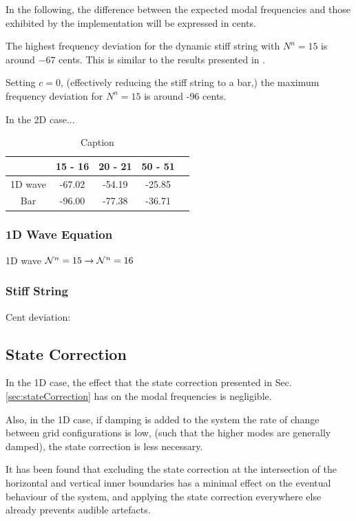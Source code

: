 \documentclass[fleqn]{jaes}
\begin{document}
In the following, the difference between the expected modal frequencies and those exhibited by the implementation will be expressed in cents.

The highest frequency deviation for the dynamic stiff string with $N^n = 15$ is around $-67$ cents. This is similar to the results presented in \cite{Willemsen2021a}.

Setting $c=0$, (effectively reducing the stiff string to a bar,) the maximum frequency deviation for $N^n=15$ is around -96 cents. 

In the 2D case...

\begin{table}[h]
    \centering
        \caption{Caption}

    \begin{tabular}{|c|c|c|c|c|}
        \hline & 15 - 16 & 20 - 21 & 50 - 51  \\\hline
        1D wave & -67.02 & -54.19 & -25.85 \\
        Bar & -96.00 & -77.38 & -36.71\\\hline
    \end{tabular}
    \label{tab:my_label}
\end{table}

\subsubsection{1D Wave Equation}

1D wave $\mathcal{N}^n = 15 \rightarrow \mathcal{N}^n = 16$ 

\subsubsection{Stiff String}

Cent deviation:

\subsection{State Correction}
In the 1D case, the effect that the state correction presented in Sec. \ref{sec:stateCorrection} has on the modal frequencies is negligible.  

Also, in the 1D case, if damping is added to the system the rate of change between grid configurations is low, (such that the higher modes are generally damped), the state correction is less necessary.

It has been found that excluding the state correction at the intersection of the horizontal and vertical inner boundaries has a minimal effect on the eventual behaviour of the system, and applying the state correction everywhere else already prevents audible artefacts.
\end{document}
